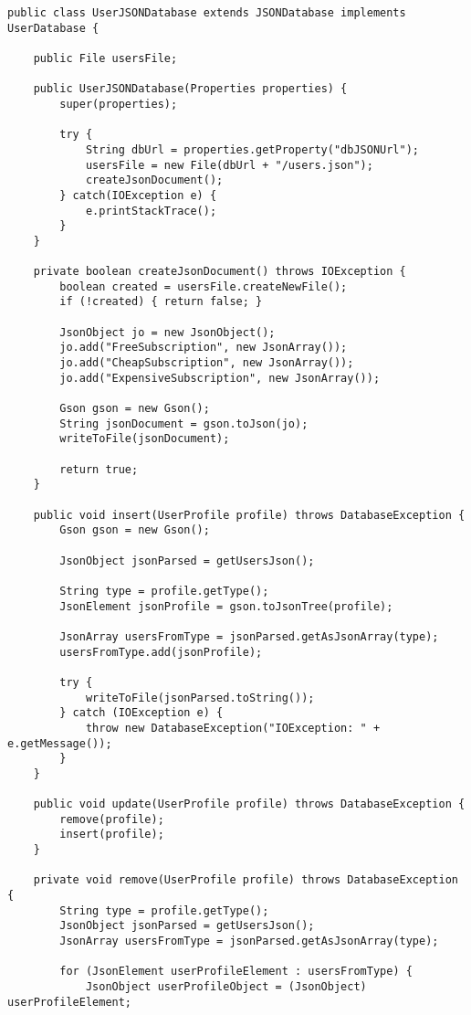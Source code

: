\begin{lstlisting}
public class UserJSONDatabase extends JSONDatabase implements UserDatabase {
    
    public File usersFile;

    public UserJSONDatabase(Properties properties) {
        super(properties);
        
        try {
            String dbUrl = properties.getProperty("dbJSONUrl");
            usersFile = new File(dbUrl + "/users.json");
            createJsonDocument();
        } catch(IOException e) {
            e.printStackTrace();
        }
    }
    
    private boolean createJsonDocument() throws IOException {
        boolean created = usersFile.createNewFile();
        if (!created) { return false; }
        
        JsonObject jo = new JsonObject();
        jo.add("FreeSubscription", new JsonArray());
        jo.add("CheapSubscription", new JsonArray());
        jo.add("ExpensiveSubscription", new JsonArray());
        
        Gson gson = new Gson();
        String jsonDocument = gson.toJson(jo);
        writeToFile(jsonDocument);
        
        return true;
    }

    public void insert(UserProfile profile) throws DatabaseException {
        Gson gson = new Gson();
        
        JsonObject jsonParsed = getUsersJson();
        
        String type = profile.getType();
        JsonElement jsonProfile = gson.toJsonTree(profile);
        
        JsonArray usersFromType = jsonParsed.getAsJsonArray(type);
        usersFromType.add(jsonProfile);

        try {
            writeToFile(jsonParsed.toString());
        } catch (IOException e) {
            throw new DatabaseException("IOException: " + e.getMessage());
        }
    }
    
    public void update(UserProfile profile) throws DatabaseException {
        remove(profile);
        insert(profile);
    }
    
    private void remove(UserProfile profile) throws DatabaseException {
        String type = profile.getType();
        JsonObject jsonParsed = getUsersJson();
        JsonArray usersFromType = jsonParsed.getAsJsonArray(type);
        
        for (JsonElement userProfileElement : usersFromType) {
            JsonObject userProfileObject = (JsonObject) userProfileElement;
            

\end{lstlisting}
